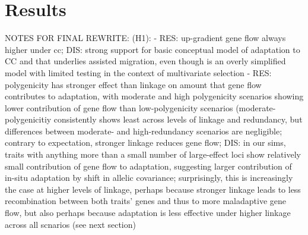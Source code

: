 \documentclass[9pt,twocolumn,twoside,lineno]{pnas-new}
\begin{document}
\section*{Results}

NOTES FOR FINAL REWRITE:
    (H1):
      - RES: up-gradient gene flow always higher under cc; DIS: strong support for basic conceptual model of adaptation to CC and that underlies assisted migration, even though is an overly simplified model with limited testing in the context of multivariate selection
      - RES: polygenicity has stronger effect than linkage on amount that gene flow contributes to adaptation, with moderate and high polygenicity scenarios showing lower contribution of gene flow than low-polygenicity scenarios (moderate-polygenicitiy consistently shows least across levels of linkage and redundancy, but differences between moderate- and high-redundancy scenarios are negligible; contrary to expectation, stronger linkage reduces gene flow; DIS: in our sims, traits with anything more than a small number of large-effect loci show relatively small contribution of gene flow to adaptation, suggesting larger contribution of in-situ adaptation by shift in allelic covariance; surprisingly, this is increasingly the case at higher levels of linkage, perhaps because stronger linkage leads to less recombination between both traits' genes and thus to more maladaptive gene flow, but also perhaps because adaptation is less effective under higher linkage across all scnarios (see next section)
      
\end{document}
